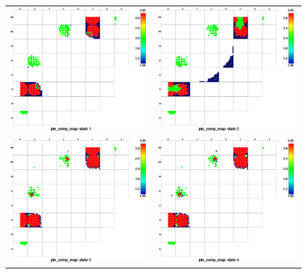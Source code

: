 \documentclass[edeposit,fullpage,11pt]{uiucthesis2009}
\begin{document}
\begin{center}
\begin{figure}[h]
\begin{tabular}{ll}
\includegraphics[trim={0 0 4.5cm 0},clip,width=0.4\linewidth]{./Figures/screening/comp1.png} & \includegraphics[trim={0 0 4.5cm 0},clip,width=0.4\linewidth]{./Figures/screening/comp2.png} \\
\includegraphics[trim={0 0 4.5cm 0},clip,width=0.4\linewidth]{./Figures/screening/comp3.png} & \includegraphics[trim={0 0 4.5cm 0},clip,width=0.4\linewidth]{./Figures/screening/comp4.png} \\

\end{tabular}
\end{figure}
\end{center}
\end{document}
